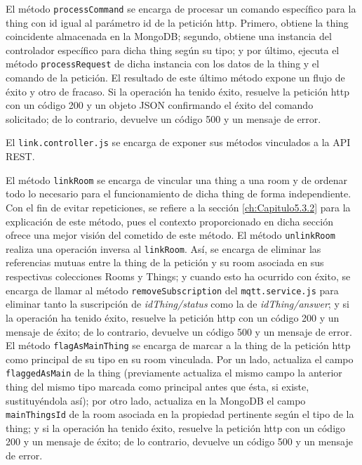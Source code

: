 El método \verb|processCommand| se encarga de procesar un comando específico para la thing con id igual al parámetro id de la petición http. Primero, obtiene la thing coincidente almacenada en la MongoDB; segundo, obtiene una instancia del controlador específico para dicha thing según su tipo; y por último, ejecuta el método \verb|processRequest| de dicha instancia con los datos de la thing y el comando de la petición. El resultado de este último método expone un flujo de éxito y otro de fracaso. Si la operación ha tenido éxito, resuelve la petición http con un código 200 y un objeto JSON confirmando el éxito del comando solicitado; de lo contrario, devuelve un código 500 y un mensaje de error.

\vspace{1cm}

El \verb|link.controller.js| se encarga de exponer sus métodos vinculados a la API REST.

\vspace{0.5cm}

El método \verb|linkRoom| se encarga de vincular una thing a una room y de ordenar todo lo necesario para el funcionamiento de dicha thing de forma independiente. Con el fin de evitar repeticiones, se refiere a la sección \ref{ch:Capitulo5.3.2} para la explicación de este método, pues el contexto proporcionado en dicha sección ofrece una mejor visión del cometido de este método.
El método \verb|unlinkRoom| realiza una operación inversa al \verb|linkRoom|. Así, se encarga de eliminar las referencias mutuas entre la thing de la petición y su room asociada en sus respectivas colecciones Rooms y Things; y cuando esto ha ocurrido con éxito, se encarga de llamar al método \verb|removeSubscription| del \verb|mqtt.service.js| para eliminar tanto la suscripción de \textit{idThing/status} como la de \textit{idThing/answer}; y si la operación ha tenido éxito, resuelve la petición http con un código 200 y un mensaje de éxito; de lo contrario, devuelve un código 500 y un mensaje de error.
El método \verb|flagAsMainThing| se encarga de marcar a la thing de la petición http como principal de su tipo en su room vinculada. Por un lado, actualiza el campo \verb|flaggedAsMain| de la thing (previamente actualiza el mismo campo la anterior thing del mismo tipo marcada como principal antes que ésta, si existe, sustituyéndola así); por otro lado, actualiza en la MongoDB el campo \verb|mainThingsId| de la room asociada en la propiedad pertinente según el tipo de la thing; y si la operación ha tenido éxito, resuelve la petición http con un código 200 y un mensaje de éxito; de lo contrario, devuelve un código 500 y un mensaje de error.

